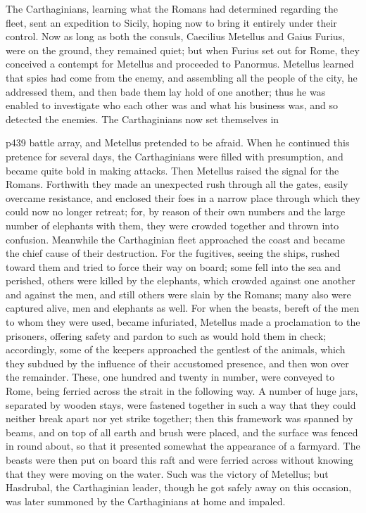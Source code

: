 The Carthaginians, learning what the Romans had determined regarding the fleet, sent an expedition to Sicily, hoping now to bring it entirely under their control. Now as long as both the consuls, Caecilius Metellus and Gaius Furius, were on the ground, they remained quiet; but when Furius set out for Rome, they conceived a contempt for Metellus and proceeded to Panormus. Metellus learned that spies had come from the enemy, and assembling all the people of the city, he addressed them, and then bade them lay hold of one another; thus he was enabled to investigate who each other was and what his business was, and so detected the enemies. The Carthaginians now set themselves in

p439 battle array, and Metellus pretended to be afraid. When he continued this pretence for several days, the Carthaginians were filled with presumption, and became quite bold in making attacks. Then Metellus raised the signal for the Romans. Forthwith they made an unexpected rush through all the gates, easily overcame resistance, and enclosed their foes in a narrow place through which they could now no longer retreat; for, by reason of their own numbers and the large number of elephants with them, they were crowded together and thrown into confusion. Meanwhile the Carthaginian fleet approached the coast and became the chief cause of their destruction. For the fugitives, seeing the ships, rushed toward them and tried to force their way on board; some fell into the sea and perished, others were killed by the elephants, which crowded against one another and against the men, and still others were slain by the Romans; many also were captured alive, men and elephants as well. For when the beasts, bereft of the men to whom they were used, became infuriated, Metellus made a proclamation to the prisoners, offering safety and pardon to such as would hold them in check; accordingly, some of the keepers approached the gentlest of the animals, which they subdued by the influence of their accustomed presence, and then won over the remainder. These, one hundred and twenty in number, were conveyed to Rome, being ferried across the strait in the following way. A number of huge jars, separated by wooden stays, were fastened together in such a way that they could neither break apart nor yet strike together; then this framework was spanned by beams, and on top of all earth and brush were placed, and the surface was fenced in round about, so that it presented somewhat the appearance of a farmyard. The beasts were then put on board this raft and were ferried across without knowing that they were moving on the water. Such was the victory of Metellus; but Hasdrubal, the Carthaginian leader, though he got safely away on this occasion, was later summoned by the Carthaginians at home and impaled.

